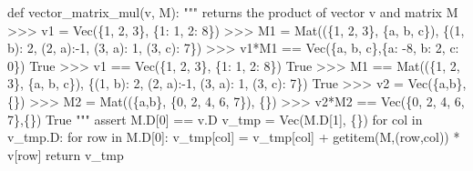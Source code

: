 \documentclass[
  letterpaper,
  DIV=11,
  numbers=noendperiod]{scrartcl}
\newenvironment{Shaded}{\begin{snugshade}}{\end{snugshade}}
\newcommand{\CommentTok}[1]{\textcolor[rgb]{0.37,0.37,0.37}{#1}}
\newcommand{\ControlFlowTok}[1]{\textcolor[rgb]{0.00,0.23,0.31}{#1}}
\newcommand{\DecValTok}[1]{\textcolor[rgb]{0.68,0.00,0.00}{#1}}
\newcommand{\KeywordTok}[1]{\textcolor[rgb]{0.00,0.23,0.31}{#1}}
\newcommand{\NormalTok}[1]{\textcolor[rgb]{0.00,0.23,0.31}{#1}}
\newcommand{\OperatorTok}[1]{\textcolor[rgb]{0.37,0.37,0.37}{#1}}
\begin{document}
\begin{Shaded}
\begin{Highlighting}[numbers=left,,]
\KeywordTok{def}\NormalTok{ vector\_matrix\_mul(v, M):}
    \CommentTok{"""}
\CommentTok{    returns the product of vector v and matrix M}
\CommentTok{    \textgreater{}\textgreater{}\textgreater{} v1 = Vec(\{1, 2, 3\}, \{1: 1, 2: 8\})}
\CommentTok{    \textgreater{}\textgreater{}\textgreater{} M1 = Mat((\{1, 2, 3\}, \{\textquotesingle{}a\textquotesingle{}, \textquotesingle{}b\textquotesingle{}, \textquotesingle{}c\textquotesingle{}\}), \{(1, \textquotesingle{}b\textquotesingle{}): 2, (2, \textquotesingle{}a\textquotesingle{}):{-}1, (3, \textquotesingle{}a\textquotesingle{}): 1, (3, \textquotesingle{}c\textquotesingle{}): 7\})}
\CommentTok{    \textgreater{}\textgreater{}\textgreater{} v1*M1 == Vec(\{\textquotesingle{}a\textquotesingle{}, \textquotesingle{}b\textquotesingle{}, \textquotesingle{}c\textquotesingle{}\},\{\textquotesingle{}a\textquotesingle{}: {-}8, \textquotesingle{}b\textquotesingle{}: 2, \textquotesingle{}c\textquotesingle{}: 0\})}
\CommentTok{    True}
\CommentTok{    \textgreater{}\textgreater{}\textgreater{} v1 == Vec(\{1, 2, 3\}, \{1: 1, 2: 8\})}
\CommentTok{    True}
\CommentTok{    \textgreater{}\textgreater{}\textgreater{} M1 == Mat((\{1, 2, 3\}, \{\textquotesingle{}a\textquotesingle{}, \textquotesingle{}b\textquotesingle{}, \textquotesingle{}c\textquotesingle{}\}), \{(1, \textquotesingle{}b\textquotesingle{}): 2, (2, \textquotesingle{}a\textquotesingle{}):{-}1, (3, \textquotesingle{}a\textquotesingle{}): 1, (3, \textquotesingle{}c\textquotesingle{}): 7\})}
\CommentTok{    True}
\CommentTok{    \textgreater{}\textgreater{}\textgreater{} v2 = Vec(\{\textquotesingle{}a\textquotesingle{},\textquotesingle{}b\textquotesingle{}\}, \{\})}
\CommentTok{    \textgreater{}\textgreater{}\textgreater{} M2 = Mat((\{\textquotesingle{}a\textquotesingle{},\textquotesingle{}b\textquotesingle{}\}, \{0, 2, 4, 6, 7\}), \{\})}
\CommentTok{    \textgreater{}\textgreater{}\textgreater{} v2*M2 == Vec(\{0, 2, 4, 6, 7\},\{\})}
\CommentTok{    True}
\CommentTok{    """}
    \ControlFlowTok{assert}\NormalTok{ M.D[}\DecValTok{0}\NormalTok{] }\OperatorTok{==}\NormalTok{ v.D}
\NormalTok{    v\_tmp }\OperatorTok{=}\NormalTok{ Vec(M.D[}\DecValTok{1}\NormalTok{], \{\})}
    \ControlFlowTok{for}\NormalTok{ col }\KeywordTok{in}\NormalTok{ v\_tmp.D:}
        \ControlFlowTok{for}\NormalTok{ row }\KeywordTok{in}\NormalTok{ M.D[}\DecValTok{0}\NormalTok{]:}
\NormalTok{            v\_tmp[col] }\OperatorTok{=}\NormalTok{ v\_tmp[col] }\OperatorTok{+}\NormalTok{ getitem(M,(row,col)) }\OperatorTok{*}\NormalTok{ v[row] }
    \ControlFlowTok{return}\NormalTok{ v\_tmp}


\end{Highlighting}
\end{Shaded}
\end{document}
